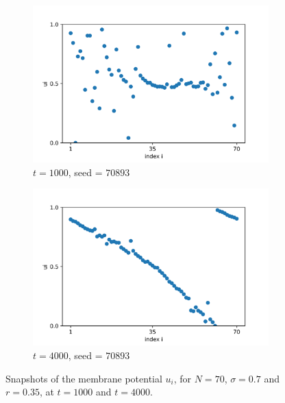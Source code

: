 \documentclass[a4paper,12pt]{article}
\begin{document}
\begin{figure}[H]
\begin{subfigure}{0.49 \textwidth}
\centering
\includegraphics[width=\linewidth]{u_seed=70893_t=1000.png}
\caption{$t=1000$, seed = $70893$}

\end{subfigure}
\hfill
\begin{subfigure}{0.49 \textwidth}
\centering
\includegraphics[width=\linewidth]{u_seed=70893_t=4000.png}
\caption{$t=4000$, seed = $70893$} 

\end{subfigure}
\caption{Snapshots of the membrane potential $u_i$, for $N=70$, $\sigma=0.7$ and $r=0.35$, at $t=1000$ and $t=4000$.}
\label{trans}
\end{figure} 
\end{document}
